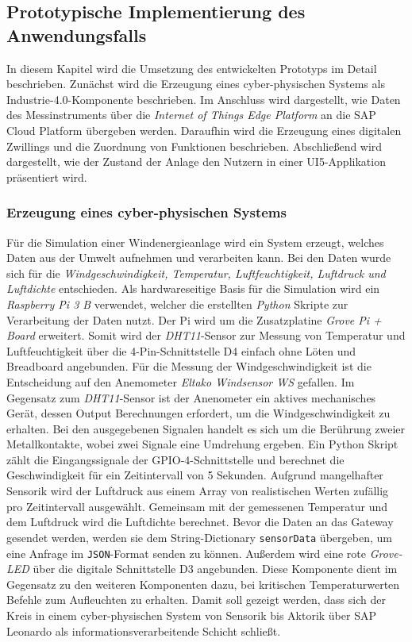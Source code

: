 

\subsection{Prototypische Implementierung des Anwendungsfalls}

In diesem Kapitel wird die Umsetzung des entwickelten Prototyps im Detail beschrieben.
Zunächst wird die Erzeugung eines cyber-physischen Systems als Industrie-4.0-Komponente beschrieben. Im Anschluss wird dargestellt, wie Daten des Messinstruments über die \textit{Internet of Things Edge Platform} an die SAP Cloud Platform übergeben werden. Daraufhin wird die Erzeugung eines digitalen Zwillings und die Zuordnung von Funktionen beschrieben. Abschließend wird dargestellt, wie der Zustand der Anlage den Nutzern in einer UI5-Applikation präsentiert wird.

\subsubsection{Erzeugung eines cyber-physischen Systems}

Für die Simulation einer Windenergieanlage wird ein System erzeugt, welches Daten aus der Umwelt aufnehmen und verarbeiten kann. Bei den Daten wurde sich für die \textit{Windgeschwindigkeit, Temperatur, Luftfeuchtigkeit, Luftdruck und Luftdichte} entschieden.
Als hardwareseitige Basis für die Simulation wird ein \textit{Raspberry Pi 3 B} verwendet, welcher die erstellten \textit{Python} Skripte zur Verarbeitung der Daten nutzt. Der Pi wird um die Zusatzplatine \textit{Grove Pi + Board} erweitert. Somit wird der \textit{DHT11}-Sensor zur Messung von Temperatur und Luftfeuchtigkeit über die 4-Pin-Schnittstelle D4 einfach ohne Löten und Breadboard angebunden. Für die Messung der Windgeschwindigkeit ist die Entscheidung auf den Anemometer \textit{Eltako Windsensor WS} gefallen. Im Gegensatz zum \textit{DHT11}-Sensor ist der Anenometer ein aktives mechanisches Gerät, dessen Output Berechnungen erfordert, um die Windgeschwindigkeit zu erhalten. Bei den ausgegebenen Signalen handelt es sich um die Berührung zweier Metallkontakte, wobei zwei Signale eine Umdrehung ergeben. Ein Python Skript zählt die Eingangssignale der GPIO-4-Schnittstelle und berechnet die Geschwindigkeit für ein Zeitintervall von 5 Sekunden. Aufgrund mangelhafter Sensorik wird der Luftdruck aus einem Array von realistischen Werten zufällig pro Zeitintervall ausgewählt. Gemeinsam mit der gemessenen Temperatur und dem Luftdruck wird die Luftdichte berechnet. Bevor die Daten an das Gateway gesendet werden, werden sie dem String-Dictionary \texttt{sensorData} übergeben, um eine Anfrage im \texttt{JSON}-Format senden zu können.
 Außerdem wird eine rote \textit{Grove-LED} über die digitale Schnittstelle D3 angebunden. Diese Komponente dient im Gegensatz zu den weiteren Komponenten dazu, bei kritischen Temperaturwerten Befehle zum Aufleuchten zu erhalten. Damit soll gezeigt werden, dass sich der Kreis in einem cyber-physischen System von Sensorik bis Aktorik über SAP Leonardo als informationsverarbeitende Schicht schließt.

